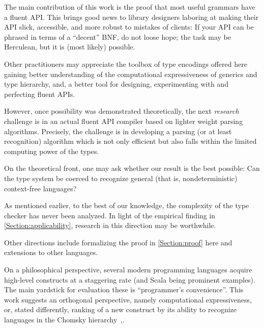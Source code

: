 The main contribution of this work is the proof that 
  most useful grammars have a fluent API\@.
This brings good news to library designers laboring
  at making their API slick, accessible, and more
  robust to mistakes of clients: 
If your API can be phrased in terms of a ``decent''
  BNF, do not loose hope; the task may be Herculean, but it is (most likely) possible. 

Other practitioners may appreciate the toolbox of type encodings offered here 
  gaining better understanding of the computational expressiveness of
  \Java generics and type hierarchy, and, a better tool
  for designing, experimenting with and perfecting fluent APIs.

However, once possibility was demonstrated theoretically, the next \emph{research} 
    challenge is in an actual fluent API compiler based on lighter weight
  parsing algorithms.
Precisely, the challenge 
  is in developing a parsing (or at least recognition) 
  algorithm which is not only efficient but also falls within the limited computing power of the \Java types. 

On the theoretical front, one may ask whether 
  our result is the best possible:
Can the \Java type system be coerced to recognize
  general (that is, nondeterministic) context-free languages?

As mentioned earlier, to the best of our knowledge, 
  the complexity of the \Java type checker has never been analyzed. 
In light of the empirical finding in \cref{Section:applicability},
  research in this direction may be worthwhile. 

Other directions include 
  formalizing the proof in \cref{Section:proof} here and 
  extensions to other languages.

On a philosophical perspective, several modern programming languages 
  acquire high-level constructs at a staggering rate
  (\CC and Scala being prominent examples). 
The main yardstick for evaluation these 
  is ``programmer's convenience''.
This work suggests an orthogonal perspective, namely 
  computational expressiveness, or, stated differently, 
    ranking of a new construct by its ability to recognize languages 
    in the Chomsky hierarchy~\cite{Chomsky:1963},.
